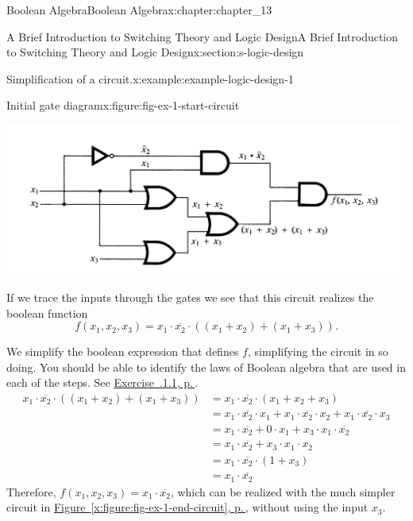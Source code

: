 \documentclass[twoside,10pt,]{book}
\newcommand{\xreffont}{\relax}
\numberwithin{equation}{section}
\begin{document}
\begin{chapterptx}{Boolean Algebra}{}{Boolean Algebra}{}{}{x:chapter:chapter_13}
\begin{sectionptx}{A Brief Introduction to Switching Theory and Logic Design}{}{A Brief Introduction to Switching Theory and Logic Design}{}{}{x:section:s-logic-design}
\begin{example}{Simplification of a circuit.}{x:example:example-logic-design-1}
\begin{figureptx}{Initial gate diagram}{x:figure:fig-ex-1-start-circuit}{}
\begin{image}{0.1}{0.8}{0.1}
\includegraphics[width=\linewidth]{images/fig-ex-1-start-circuit.png}
\end{image}%
\tcblower
\end{figureptx}%
If we trace the inputs through the gates we see that this circuit realizes the boolean function%
\begin{equation*}
f\left(x_1, x_2, x_3 \right)=x_1 \cdot  \overline{x_2}\cdot \left(\left( x_1 + x_2\right) + \left(x_1 + x_3\right)\right).
\end{equation*}
%
\par
We simplify the boolean expression that defines \(f\), simplifying the circuit in so doing.  You should be able to identify the laws of Boolean algebra that are used in each of the steps.  See \hyperlink{x:exercise:exercise-137-1}{Exercise~{\xreffont 13.7.1.1}, p.\,\pageref{x:exercise:exercise-137-1}}.%
\begin{equation*}
\begin{split}
x_1 \cdot  \overline{x_2}\cdot \left(\left( x_1 + x_2\right) + \left(x_1 + x_3\right)\right) & =
x_1 \cdot \overline{x_2}\cdot \left(x_1+ x_2 + x_3\right)\\
& = x_1 \cdot  \overline{x_2} \cdot  x_1 + x_1 \cdot \overline{x_2} \cdot x_2  + x_1 \cdot  \overline{x_2} \cdot x_3 \\
&= x_1\cdot  \overline{x_2} + 0 \cdot  x_1 + x_3 \cdot  x_1 \cdot  \overline{x_2}\\
&=x_1 \cdot  \overline{x_2} + x_3 \cdot  x_1 \cdot  \overline{x_2} \\
&= x_1 \cdot  \overline{x_2} \cdot  \left(1 + x_3\right)\\
&= x_1 \cdot  \overline{x_2}
\end{split}
\end{equation*}
Therefore, \(f\left(x_1, x_2, x_3\right)=x_1 \cdot  \overline{x_2}\), which can be realized with the much simpler circuit in \hyperref[x:figure:fig-ex-1-end-circuit]{Figure~{\xreffont\ref{x:figure:fig-ex-1-end-circuit}}, p.\,\pageref{x:figure:fig-ex-1-end-circuit}}, without using the input \(x_3\).%

\end{example}
\end{sectionptx}
\end{chapterptx}
\end{document}
